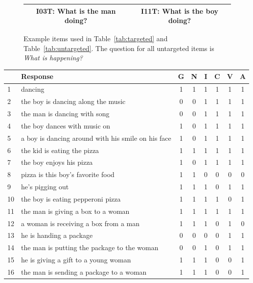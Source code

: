 \documentclass[12pt,notitlepage]{article}
\begin{document}
\begin{figure}[h]
\begin{center}
\begin{tabular}{|c|c|}
\hline
I03T: What is the man doing? & I11T: What is the boy doing? \\
\hline
\end{tabular}
\end{center}
\caption{Example items used in Table~\ref{tab:targeted} and Table~\ref{tab:untargeted}. The question for all untargeted items is \textit{What is happening?}}
\label{fig:appendix1}
\end{figure}

\clearpage 

\begin{table}[h]
\begin{center}
\begin{tabular}{|l|p{11cm}|c|c|c|c|c|c|}
\hline
& Response & G & N & I & C & V & A \\
\hline
\hline
1 & dancing & 1 & 1 & 1 & 1 & 1 & 1 \\
\hline
2 & the boy is dancing along the music & 0 & 0 & 1 & 1 & 1 & 1 \\
\hline
3 & the man is dancing with song & 0 & 0 & 1 & 1 & 1 & 1 \\
\hline
4 & the boy dances with music on & 1 & 0 & 1 & 1 & 1 & 1 \\
\hline
5 & a boy is dancing around with his smile on his face & 1 & 0 & 1 & 1 & 1 & 1 \\
\hline
\hline
6 & the kid is eating the pizza & 1 & 1 & 1 & 1 & 1 & 1 \\
\hline
7 & the boy enjoys his pizza & 1 & 0 & 1 & 1 & 1 & 1 \\
\hline
8 & pizza is this boy's favorite food & 1 & 1 & 0 & 0 & 0 & 0 \\
\hline
9 & he's pigging out & 1 & 1 & 1 & 0 & 1 & 1 \\
\hline
10 & the boy is eating pepperoni pizza & 1 & 1 & 1 & 1 & 0 & 1 \\
\hline
\hline
11 & the man is giving a box to a woman & 1 & 1 & 1 & 1 & 1 & 1 \\
\hline
12 & a woman is receiving a box from a man & 1 & 1 & 1 & 0 & 1 & 0 \\
\hline
13 & he is handing a package & 0 & 0 & 0 & 0 & 1 & 1 \\
\hline
14 & the man is putting the package to the woman & 0 & 0 & 1 & 0 & 1 & 1 \\
\hline
15 & he is giving a gift to a young woman & 1 & 1 & 1 & 0 & 0 & 1 \\
\hline
16 & the man is sending a package to a woman & 1 & 1 & 1 & 0 & 0 & 1 \\

\end{tabular}
\end{center}
\end{table}
\end{document}
